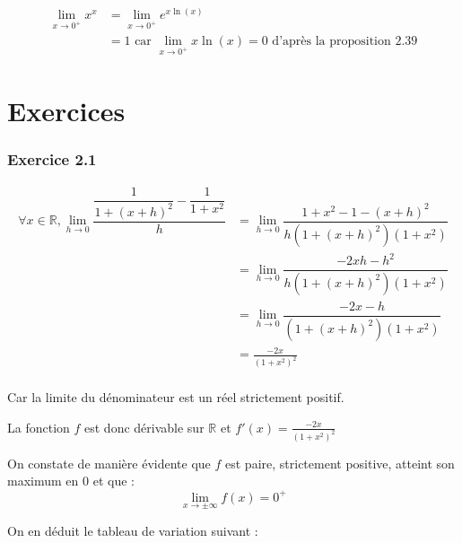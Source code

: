 \documentclass[a4paper,10pt]{report}
\begin{document}
\begin{equation*}
	\begin{split}
		\lim_{x\rightarrow 0^{+}} x^x
		&= \lim_{x\rightarrow 0^{+}} e^{x\ln(x)} \\
	    &= 1 \text{ car  $\lim_{x\rightarrow 0^{+}} x\ln(x) = 0$ d'après la proposition 2.39}
	\end{split}
\end{equation*}

\chapter*{Exercices}

\subsection*{Exercice 2.1}

\begin{equation*}
	\begin{split}
		\forall x \in \mathbb{R}, \lim_{h\rightarrow 0} \dfrac{\dfrac{1}{1+(x+h)^2}-\dfrac{1}{1+x^2}}{h}
		&= \lim_{h\rightarrow 0} \dfrac{1+x^2-1-(x+h)^2}{h(1+(x+h)^2)(1+x^2)} \\
		&= \lim_{h\rightarrow 0} \dfrac{-2xh-h^2}{h(1+(x+h)^2)(1+x^2)} \\
		&= \lim_{h\rightarrow 0} \dfrac{-2x-h}{(1+(x+h)^2)(1+x^2)} \\
		&= \frac{-2x}{(1+x^2)^2} \\
	\end{split}
\end{equation*}

Car la limite du dénominateur est un réel strictement positif.

La fonction $f$ est donc dérivable sur $\mathbb{R}$ et $f'(x) = \frac{-2x}{(1+x^2)^2}$

On constate de manière évidente que $f$ est paire, strictement positive, atteint son maximum en $0$ et que :
\begin{displaymath}
	\lim_{x \rightarrow \pm \infty} f(x) = 0^{+}
\end{displaymath}


On en déduit le tableau de variation suivant :

\end{document}
